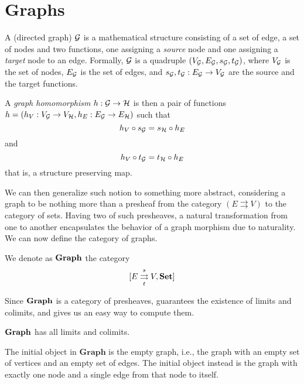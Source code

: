 \section{Graphs}\label{sect:graphs}

A (directed graph) $\mathcal{G}$ is a mathematical structure consisting of a set of edge, a set of nodes and two functions, one assigning a \emph{source} node and one assigning a \emph{target} node to an edge. Formally, $\mathcal{G}$ is a quadruple $(V_{\mathcal{G}}, E_{\mathcal{G}}, s_{\mathcal{G}}, t_{\mathcal{G}})$, where $V_{\mathcal{G}}$ is the set of nodes, $E_{\mathcal{G}}$ is the set of edges, and $s_{\mathcal{G}}, t_{\mathcal{G}}: E_{\mathcal{G}} \rightarrow V_{\mathcal{G}}$ are the source and the target functions.

A \emph{graph homomorphism} $h: \mathcal{G \rightarrow H}$ is then a pair of functions $h = (h_V: V_{\mathcal{G}} \rightarrow V_{\mathcal{H}}, h_E: E_{\mathcal{G}} \rightarrow E_{\mathcal{H}})$ such that
    \[
        h_V \circ s_{\mathcal{G}} = s_{\mathcal{H}} \circ h_E
    \]
    and
    \[
        h_V \circ t_{\mathcal{G}} = t_{\mathcal{H}} \circ h_E
    \]
that is, a structure preserving map.

We can then generalize such notion to something more abstract, considering a graph to be nothing more than a presheaf from the category $(E \rightrightarrows V)$ to the category of sets.
Having two of such presheaves, a natural transformation from one to another encapsulates the behavior of a graph morphism due to naturality. We can now define the category of graphs.

\begin{definition}\label{def:cat_of_graph}
    We denote as $\mathbf{Graph}$ the category $$[E \mathrel{\mathop{\rightrightarrows}^{s}_{t}} V , \mathbf{Set}]$$
\end{definition}

Since $\mathbf{Graph}$ is a category of presheaves,  guarantees the existence of limits and colimits, and gives us an easy way to compute them.

\begin{cor}\label{cor:graph_has_co_limits}
    $\mathbf{Graph}$ has all limits and colimits.
\end{cor}

\begin{example}\label{ex:in_term_in_graph}
    The initial object in $\mathbf{Graph}$ is the empty graph, i.e., the graph with an empty set of vertices and an empty set of edges. The initial object instead is the graph with exactly one node and a single edge from that node to itself.
\end{example}

